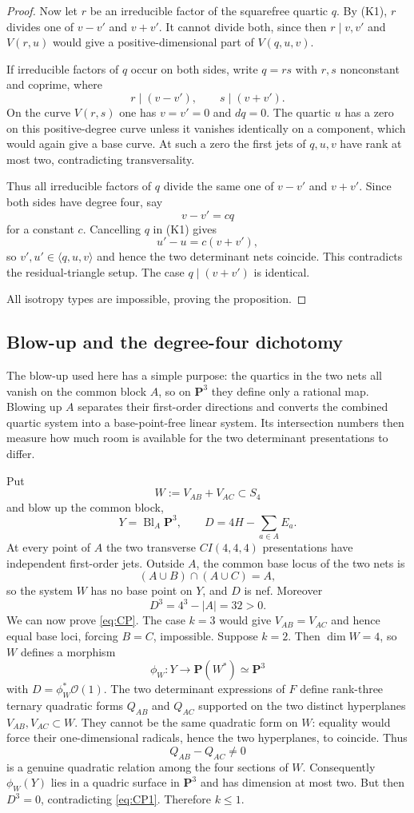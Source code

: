 \documentclass[11pt,reqno]{amsart}
\theoremstyle{remark}
\newcommand{\PP}{\mathbf P}
\newcommand{\cO}{\mathcal O}
\begin{document}
\begin{proof}
Now let $r$ be an irreducible factor of the squarefree quartic $q$.  By (K1), $r$ divides one of $v-v'$ and $v+v'$.  It cannot divide both, since then $r\mid v,v'$ and $V(r,u)$ would give a positive-dimensional part of $V(q,u,v)$.

If irreducible factors of $q$ occur on both sides, write $q=rs$ with $r,s$ nonconstant and coprime, where
\[
r\mid(v-v'),\qquad s\mid(v+v').
\]
On the curve $V(r,s)$ one has $v=v'=0$ and $dq=0$.  The quartic $u$ has a zero on this positive-degree curve unless it vanishes identically on a component, which would again give a base curve.  At such a zero the first jets of $q,u,v$ have rank at most two, contradicting transversality.

Thus all irreducible factors of $q$ divide the same one of $v-v'$ and $v+v'$.  Since both sides have degree four, say
\[
v-v'=cq
\]
for a constant $c$.  Cancelling $q$ in (K1) gives
\[
u'-u=c(v+v'),
\]
so $v',u'\in\langle q,u,v\rangle$ and hence the two determinant nets coincide.  This contradicts the residual-triangle setup.  The case $q\mid(v+v')$ is identical.

All isotropy types are impossible, proving the proposition.
\end{proof}

\subsection{Blow-up and the degree-four dichotomy}
The blow-up used here has a simple purpose: the quartics in the two nets all vanish on the common block $A$, so on $\PP^3$ they define only a rational map.  Blowing up $A$ separates their first-order directions and converts the combined quartic system into a base-point-free linear system.  Its intersection numbers then measure how much room is available for the two determinant presentations to differ.

Put
\[
W:=V_{AB}+V_{AC}\subset S_4
\]
and blow up the common block,
\[
Y=\operatorname{Bl}_A\PP^3,
\qquad
D=4H-\sum_{a\in A}E_a.
\]
At every point of $A$ the two transverse $CI(4,4,4)$ presentations have independent first-order jets.  Outside $A$, the common base locus of the two nets is
\[
(A\cup B)\cap(A\cup C)=A,
\]
so the system $W$ has no base point on $Y$, and $D$ is nef.  Moreover
\[
D^3=4^3-|A|=32>0. \tag{CP1}\label{eq:CP1}
\]
We can now prove \eqref{eq:CP}.  The case $k=3$ would give $V_{AB}=V_{AC}$ and hence equal base loci, forcing $B=C$, impossible.  Suppose $k=2$.  Then $\dim W=4$, so $W$ defines a morphism
\[
\phi_W:Y\longrightarrow\PP(W^*)\simeq\PP^3
\]
with $D=\phi_W^*\cO(1)$.  The two determinant expressions of $F$ define rank-three ternary quadratic forms $Q_{AB}$ and $Q_{AC}$ supported on the two distinct hyperplanes $V_{AB},V_{AC}\subset W$.  They cannot be the same quadratic form on $W$: equality would force their one-dimensional radicals, hence the two hyperplanes, to coincide.  Thus
\[
Q_{AB}-Q_{AC}\ne0
\]
is a genuine quadratic relation among the four sections of $W$.  Consequently $\phi_W(Y)$ lies in a quadric surface in $\PP^3$ and has dimension at most two.  But then $D^3=0$, contradicting \eqref{eq:CP1}.  Therefore $k\le1$.
\end{document}
